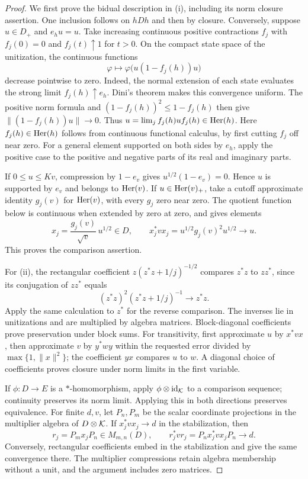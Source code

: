 \begin{proof}
We first prove the bidual description in (i), including its norm
closure assertion.  One inclusion follows on \(hDh\) and then by
closure.  Conversely, suppose \(u\in D_+\) and \(e_hu=u\).
Take increasing continuous positive contractions \(f_j\) with
\(f_j(0)=0\) and \(f_j(t)\uparrow1\) for \(t>0\).  On the compact
state space of the unitization, the continuous functions
\[
 \varphi\longmapsto
 \varphi\bigl(u(1-f_j(h))u\bigr)
\]
decrease pointwise to zero.  Indeed, the normal extension of each
state evaluates the strong limit \(f_j(h)\uparrow e_h\).
Dini's theorem makes this convergence uniform.  The positive norm
formula and \((1-f_j(h))^2\le1-f_j(h)\) then give
\(\|(1-f_j(h))u\|\to0\).  Thus
\(u=\lim_j f_j(h)u f_j(h)\in\operatorname{Her}(h)\).
Here \(f_j(h)\in\operatorname{Her}(h)\) follows from continuous functional
calculus, by first cutting \(f_j\) off near zero.  For a general
element supported on both sides by \(e_h\), apply the positive case
to the positive and negative parts of its real and imaginary parts.

If \(0\le u\le Kv\), compression by \(1-e_v\) gives
\(u^{1/2}(1-e_v)=0\).  Hence \(u\) is supported by \(e_v\) and
belongs to \(\operatorname{Her}(v)\).  If \(u\in\operatorname{Her}(v)_+\), take a cutoff
approximate identity \(g_j(v)\) for \(\operatorname{Her}(v)\), with every \(g_j\)
zero near zero.  The quotient function below is continuous when
extended by zero at zero, and gives elements
\[
 x_j=\frac{g_j(v)}{\sqrt v}\,u^{1/2}\in D,\qquad
 x_j^*v x_j=u^{1/2}g_j(v)^2u^{1/2}\longrightarrow u.
\]
This proves the comparison assertion.

For (ii), the rectangular coefficient
\(z(z^*z+1/j)^{-1/2}\) compares \(z^*z\) to \(zz^*\), since its
conjugation of \(zz^*\) equals
\[
 (z^*z)^2(z^*z+1/j)^{-1}\longrightarrow z^*z.
\]
Apply the same calculation to \(z^*\) for the reverse comparison.
The inverses lie in unitizations and are multiplied by algebra
matrices.  Block-diagonal coefficients prove preservation under
block sums.  For transitivity, first approximate \(u\) by \(x^*vx\),
then approximate \(v\) by \(y^*wy\) within the requested error
divided by \(\max\{1,\|x\|^2\}\); the coefficient \(yx\) compares
\(u\) to \(w\).  A diagonal choice of coefficients proves closure
under norm limits in the first variable.

If \(\phi:D\to E\) is a \(*\)-homomorphism, apply
\(\phi\otimes\operatorname{id}_{\mathcal K}\) to a comparison sequence; continuity
preserves its norm limit.  Applying this in both directions preserves
equivalence.  For finite \(d,v\), let \(P_n,P_m\) be the scalar
coordinate projections in the multiplier algebra of \(D\otimes\mathcal K\).
If \(x_j^*vx_j\to d\) in the stabilization, then
\[
 r_j=P_mx_jP_n\in M_{m,n}(D),\qquad
 r_j^*vr_j=P_nx_j^*vx_jP_n\longrightarrow d.
\]
Conversely, rectangular coefficients embed in the stabilization and
give the same convergence there.  The multiplier compressions retain
algebra membership without a unit, and the argument includes zero
matrices.


\end{proof}
